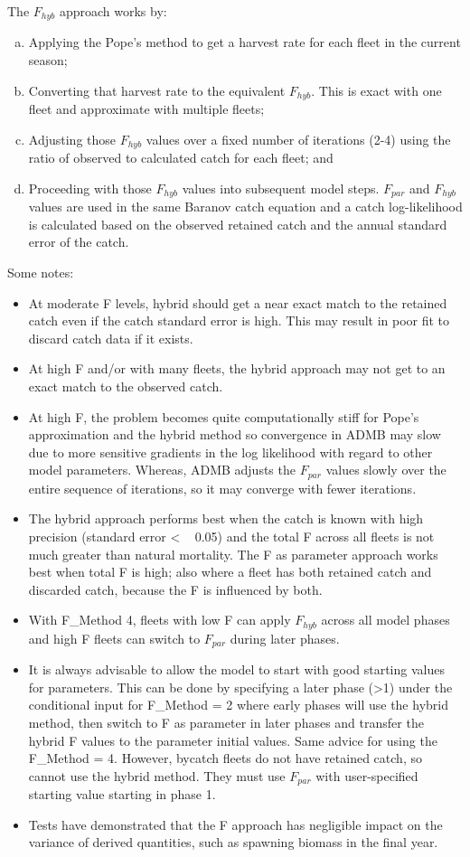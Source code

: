 The $F_{hyb}$ approach works by:
\begin{enumerate}[a.]
	\item Applying the Pope’s method to get a harvest rate for each fleet in the current season;
	\item Converting that harvest rate to the equivalent $F_{hyb}$. This is exact with one fleet and approximate with multiple fleets;
	\item Adjusting those $F_{hyb}$ values over a fixed number of iterations (2-4) using the ratio of observed to calculated catch for each fleet; and
	\item Proceeding with those $F_{hyb}$ values into subsequent model steps. $F_{par}$ and $F_{hyb}$ values are used in the same Baranov catch equation and a catch log-likelihood is calculated based on the observed retained catch and the annual standard error of the catch.
\end{enumerate}

Some notes:
\begin{itemize}
	\item At moderate F levels, hybrid should get a near exact match to the retained catch even if the catch standard error is high. This may result in poor fit to discard catch data if it exists.
	\item At high F and/or with many fleets, the hybrid approach may not get to an exact match to the observed catch.
	\item At high F, the problem becomes quite computationally stiff for Pope’s approximation and the hybrid method so convergence in ADMB may slow due to more sensitive gradients in the log likelihood with regard to other model parameters. Whereas, ADMB adjusts the $F_{par}$ values slowly over the entire sequence of iterations, so it may converge with fewer iterations.
	\item The hybrid approach performs best when the catch is known with high precision (standard error < ~ 0.05) and the total F across all fleets is not much greater than natural mortality. The F as parameter approach works best when total F is high; also where a fleet has both retained catch and discarded catch, because the F is influenced by both. 
	\item With F\_Method 4, fleets with low F can apply $F_{hyb}$ across all model phases and high F fleets can switch to $F_{par}$ during later phases.
	\item It is always advisable to allow the model to start with good starting values for parameters. This can be done by specifying a later phase (>1) under the conditional input for F\_Method = 2 where early phases will use the hybrid method, then switch to F as parameter in later phases and transfer the hybrid F values to the parameter initial values. Same advice for using the F\_Method = 4. However, bycatch fleets do not have retained catch, so cannot use the hybrid method. They must use $F_{par}$ with user-specified starting value starting in phase 1.
	\item Tests have demonstrated that the F approach has negligible impact on the variance of derived quantities, such as spawning biomass in the final year.
\end{itemize}

